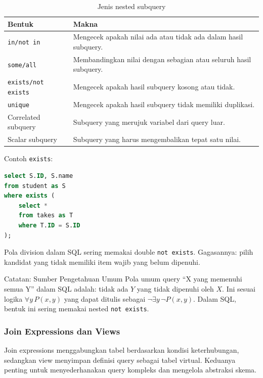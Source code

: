 \begin{table}[H]
\centering
\small
\begin{tabularx}{\textwidth}{|L{0.20\textwidth}|X|}
\hline
\textbf{Bentuk} & \textbf{Makna} \\
\hline
\texttt{in/not in} & Mengecek apakah nilai ada atau tidak ada dalam hasil subquery. \\
\hline
\texttt{some/all} & Membandingkan nilai dengan sebagian atau seluruh hasil subquery. \\
\hline
\texttt{exists/not exists} & Mengecek apakah hasil subquery kosong atau tidak. \\
\hline
\texttt{unique} & Mengecek apakah hasil subquery tidak memiliki duplikasi. \\
\hline
Correlated subquery & Subquery yang merujuk variabel dari query luar. \\
\hline
Scalar subquery & Subquery yang harus mengembalikan tepat satu nilai. \\
\hline
\end{tabularx}
\caption{Jenis nested subquery}
\label{tab:sql-subqueries}
\end{table}

Contoh \texttt{exists}:
\begin{lstlisting}[language=SQL, caption={Contoh correlated subquery}, label={lst:sql-correlated}]
select S.ID, S.name
from student as S
where exists (
    select *
    from takes as T
    where T.ID = S.ID
);
\end{lstlisting}

Pola division dalam SQL sering memakai double \texttt{not exists}. Gagasannya: pilih kandidat yang tidak memiliki item wajib yang belum dipenuhi.

\begin{cmt}{Catatan: Sumber Pengetahuan Umum}{}
Pola umum query ``X yang memenuhi semua Y'' dalam SQL adalah: tidak ada \(Y\) yang tidak dipenuhi oleh \(X\). Ini sesuai logika \(\forall y\,P(x,y)\) yang dapat ditulis sebagai \(\neg \exists y\,\neg P(x,y)\). Dalam SQL, bentuk ini sering memakai nested \texttt{not exists}.
\end{cmt}

\subsubsection{Join Expressions dan Views}

\begin{jawab}
Join expressions menggabungkan tabel berdasarkan kondisi keterhubungan, sedangkan view menyimpan definisi query sebagai tabel virtual. Keduanya penting untuk menyederhanakan query kompleks dan mengelola abstraksi skema.
\end{jawab}

